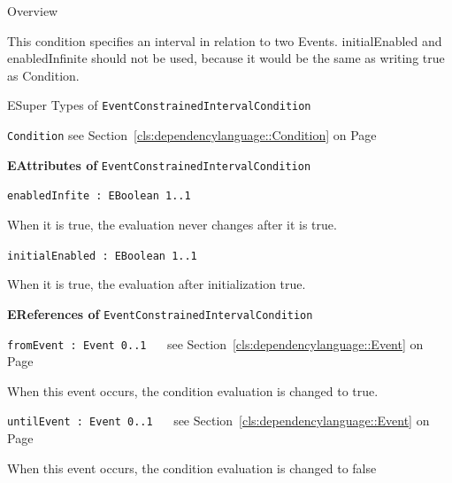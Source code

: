 	\begin{longdescription}
		\item[Overview] 		
				

	

		This condition specifies an interval in relation to two Events.
initialEnabled and enabledInfinite should not be used, because it would be the same as writing true as Condition.		
		\item[ESuper Types of \texttt{EventConstrainedIntervalCondition}] ~
			\begin{longdescription}
				\item[\texttt{Condition}] see Section~\ref{cls:dependencylanguage::Condition} on Page~\pageref{cls:dependencylanguage::Condition}						\end{longdescription}
		
	
			\item[\textbf{EAttributes of} \texttt{EventConstrainedIntervalCondition}] ~
			\begin{longdescription}
	\item[\texttt{enabledInfite : EBoolean \symbol{"5B}1..1\symbol{"5D}
}] ~
	
	
	\nopagebreak
		
				

	

		When it is true, the evaluation never changes after it is true.		
	\item[\texttt{initialEnabled : EBoolean \symbol{"5B}1..1\symbol{"5D}
}] ~
	
	
	\nopagebreak
		
				

	

		When it is true, the evaluation after initialization true.		
			\end{longdescription}
			\item[\textbf{EReferences of} \texttt{EventConstrainedIntervalCondition}] ~
			\begin{longdescription}
	\item[\texttt{fromEvent : Event \symbol{"5B}0..1\symbol{"5D}
}] ~
	see Section~\ref{cls:dependencylanguage::Event} on Page~\pageref{cls:dependencylanguage::Event}
	
	\nopagebreak
		
				

	

		When this event occurs, the condition evaluation is changed to true.		
	\item[\texttt{untilEvent : Event \symbol{"5B}0..1\symbol{"5D}
}] ~
	see Section~\ref{cls:dependencylanguage::Event} on Page~\pageref{cls:dependencylanguage::Event}
	
	\nopagebreak
		
				

	

		When this event occurs, the condition evaluation is changed to false		
			\end{longdescription}
	
	\end{longdescription}
	


